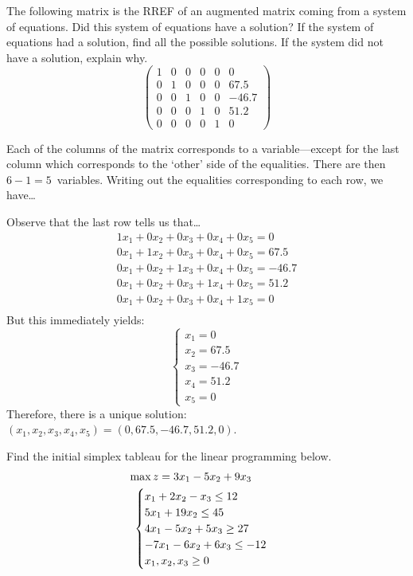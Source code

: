 \documentclass[12pt,letterpaper]{exam}
\begin{document}
\begin{questions}
\newpage
\question[10] The following matrix is the RREF of an augmented matrix coming from a system of equations. Did this system of equations have a solution? If the system of equations had a solution, find all the possible solutions. If the system did not have a solution, explain why. 
	\[
	\begin{pmatrix}
	1 & 0 & 0 & 0 & 0 & 0 \\
	0 & 1 & 0 & 0 & 0 & 67.5 \\
	0 & 0 & 1 & 0 & 0 & -46.7 \\
	0 & 0 & 0 & 1 & 0 & 51.2 \\
	0 & 0 & 0 & 0 & 1 & 0 
	\end{pmatrix}
	\] \pspace

\sol Each of the columns of the matrix corresponds to a variable---except for the last column which corresponds to the `other' side of the equalities. There are then $6 - 1= 5$~variables. Writing out the equalities corresponding to each row, we have\dots


Observe that the last row tells us that\dots
	\[
	\begin{gathered}
	1x_1 + 0x_2 + 0x_3 + 0x_4 + 0x_5= 0 \\
	0x_1 + 1x_2 + 0x_3 + 0x_4 + 0x_5= 67.5 \\
	0x_1 + 0x_2 + 1x_3 + 0x_4 + 0x_5= -46.7 \\
	0x_1 + 0x_2 + 0x_3 + 1x_4 + 0x_5= 51.2 \\
	0x_1 + 0x_2 + 0x_3 + 0x_4 + 1x_5= 0 \\
	\end{gathered}
	\]
But this immediately yields:
	\[
	\begin{cases}
	x_1= 0 \\
	x_2= 67.5 \\
	x_3= -46.7 \\
	x_4= 51.2 \\
	x_5= 0
	\end{cases}
	\]
Therefore, there is a unique solution: $(x_1, x_2, x_3, x_4, x_5)= (0, 67.5, -46.7, 51.2, 0)$. 



\newpage
\question[10] Find the initial simplex tableau for the linear programming below. 
	\[
	\begin{gathered}
	\hspace{-1cm} \max z= 3x_1 - 5x_2 + 9x_3 \\
	\begin{cases}
	x_1 + 2x_2 - x_3 \leq 12 \\
	5x_1 + 19x_2 \leq 45 \\
	4x_1 - 5x_2 + 5x_3 \geq 27 \\
	-7x_1 - 6x_2 + 6x_3 \leq -12 \\
	x_1, x_2, x_3 \geq 0
	\end{cases}
	\end{gathered}
	\] \pspace


\end{questions}
\end{document}
